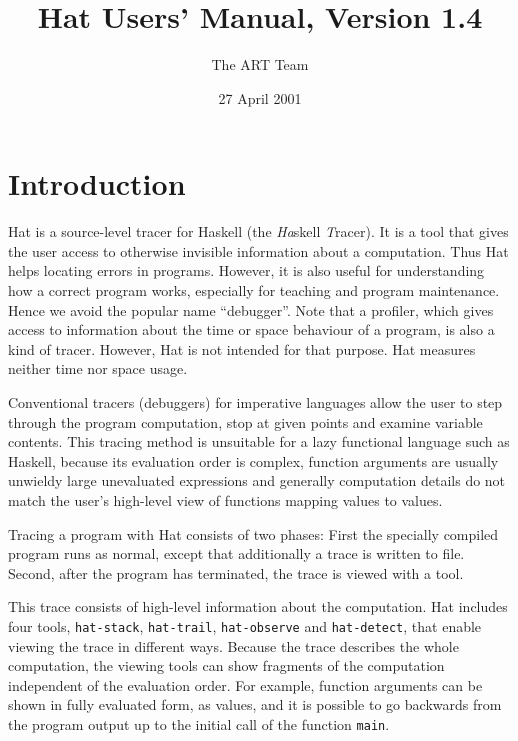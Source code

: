 \documentclass[12pt]{article}
\begin{document}
\title{Hat Users' Manual, Version 1.4}
\author{The ART Team}
\date{27 April 2001}
\maketitle
\vspace{-8ex}

\thispagestyle{empty}

\tableofcontents


\newpage
\section{Introduction}\label{introduction}

Hat is a source-level tracer for Haskell (the \emph{Ha}skell \emph{T}racer). It is a tool that gives the user access to otherwise invisible information about a computation. Thus Hat helps locating errors in programs. However, it is also useful for understanding how a correct program works, especially for teaching and program maintenance. Hence we avoid the popular name ``debugger''. Note that a profiler, which gives access to information about the time or space behaviour of a program, is also a kind of tracer. However, Hat is not intended for that purpose. Hat measures neither time nor space usage.

Conventional tracers (debuggers) for imperative languages allow the user to step through the program computation, stop at given points and examine variable contents.
This tracing method is unsuitable for a lazy functional language such as Haskell, because its evaluation order is complex, function arguments are usually unwieldy large unevaluated expressions and generally computation details do not match the user's high-level view of functions mapping values to values.

Tracing a program with Hat consists of two phases: First the specially compiled program runs as normal, except that additionally a trace is written to file. Second, after the program has terminated, the trace is viewed with a tool. 

 This trace consists of high-level information about the computation. Hat includes four tools, \texttt{hat-stack}, \texttt{hat-trail}, \texttt{hat-observe} and \texttt{hat-detect}, that enable viewing the trace in different ways. Because the trace describes the whole computation, the viewing tools can show fragments of the computation independent of the evaluation order. For example, function arguments can be shown in fully evaluated form, as values, and it is possible to go backwards from the program output up to the initial call of the function \texttt{main}.
\end{document}
